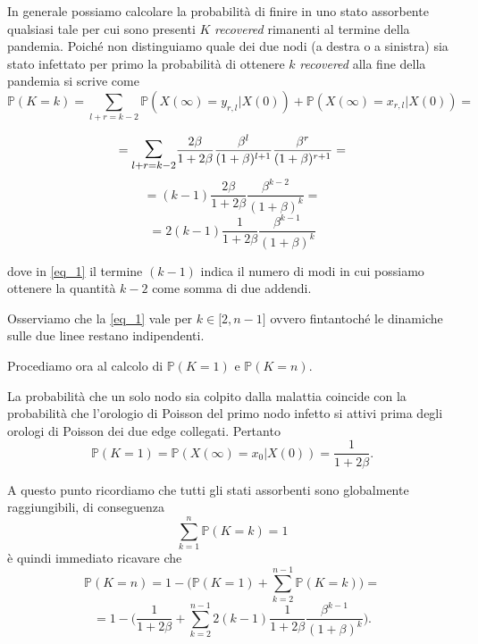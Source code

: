        In generale possiamo calcolare la probabilità di finire in uno stato assorbente qualsiasi tale per cui sono presenti $K$ \textit{recovered} rimanenti al termine della pandemia. Poiché non distinguiamo quale dei due nodi (a destra o a sinistra) sia stato infettato per primo la probabilità di ottenere $k$ \textit{recovered} alla fine della pandemia si scrive come
        \[
	\mathbb{P}(K=k)=\sum_{l+r=k-2} \mathbb{P}(X(\infty)=y_{r,l} | X(0))  +\mathbb{P}(X(\infty)=x_{r,l} | X(0))=
        \]

                \[
	=\mathlarger{\mathlarger{\sum}}_{l+r=k-2}\frac{2\beta}{1+2\beta}\frac{\beta^l}{(1+\beta)^{l+1}}\frac{\beta^r}{(1+\beta)^{r+1}} =
        \]
          \[
	=(k-1)\frac{2\beta}{1+2\beta}\frac{\beta^{k-2}}{(1+\beta)^k}=
        \]
         \begin{equation}\label{eq_1}
	=2(k-1)\frac{1}{1+2\beta}\frac{\beta^{k-1}}{(1+\beta)^k}
	\end{equation}
       

dove in \eqref{eq_1} il termine $(k-1)$ indica il numero di modi in cui possiamo ottenere la quantità $k-2$ come somma di due addendi.

Osserviamo che la \eqref{eq_1} vale per $k \in \lbrack 2,n-1 \rbrack $ ovvero fintantoché le dinamiche sulle due linee restano indipendenti. 

Procediamo ora al calcolo di $\mathbb{P}(K=1)$ e $\mathbb{P}(K=n)$.

La probabilità che un solo nodo sia colpito dalla malattia coincide con la probabilità che l'orologio di Poisson del primo nodo infetto si attivi prima degli orologi di Poisson dei due edge collegati.
Pertanto
  \[
		\mathbb{P}(K=1)=\mathbb{P}(X(\infty)= x_0 | X(0))=\frac{1}{1+2\beta}.
		      \]

       
  A questo punto ricordiamo che tutti gli stati assorbenti sono globalmente raggiungibili, di conseguenza
       \[
		\sum_{k=1}^{n} \mathbb{P}(K=k) =1
        \]
	è quindi immediato ricavare che
          \[
		\mathbb{P}(K=n)=1-\bigg(\mathbb{P}(K=1)+\sum_{k=2}^{n-1}\mathbb{P}(K=k) \bigg) =
        \]
         \[
		=1-\bigg(\frac{1}{1+2\beta}+\sum_{k=2}^{n-1}2(k-1)\frac{1}{1+2\beta}\frac{\beta^{k-1}}{(1+\beta)^k} \bigg).
        \]


	  






